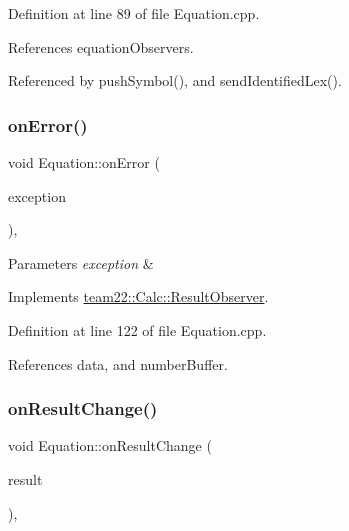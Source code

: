 Definition at line 89 of file Equation.\+cpp.



References equation\+Observers.



Referenced by push\+Symbol(), and send\+Identified\+Lex().

\mbox{\label{classteam22_1_1_calc_1_1_equation_a4e7a0614867931bcc714440441cdd894}} 
\subsubsection{\texorpdfstring{on\+Error()}{onError()}}
{\footnotesize\ttfamily void Equation\+::on\+Error (\begin{DoxyParamCaption}\item[{\hyperlink{class_interpret_exception}{Interpret\+Exception}}]{exception }\end{DoxyParamCaption})\hspace{0.3cm}{\ttfamily [override]}, {\ttfamily [virtual]}}


\begin{DoxyParams}{Parameters}
{\em exception} & \\
\hline
\end{DoxyParams}


Implements \hyperlink{classteam22_1_1_calc_1_1_result_observer_ad36cf8df89853d60f91094800c01d329}{team22\+::\+Calc\+::\+Result\+Observer}.



Definition at line 122 of file Equation.\+cpp.



References data, and number\+Buffer.

\mbox{\label{classteam22_1_1_calc_1_1_equation_a302c295e099f589897a1bad4b02d3de8}} 
\subsubsection{\texorpdfstring{on\+Result\+Change()}{onResultChange()}}
{\footnotesize\ttfamily void Equation\+::on\+Result\+Change (\begin{DoxyParamCaption}\item[{\hyperlink{classteam22_1_1_math_1_1_number}{Math\+::\+Number}}]{result }\end{DoxyParamCaption})\hspace{0.3cm}{\ttfamily [override]}, {\ttfamily [virtual]}}


